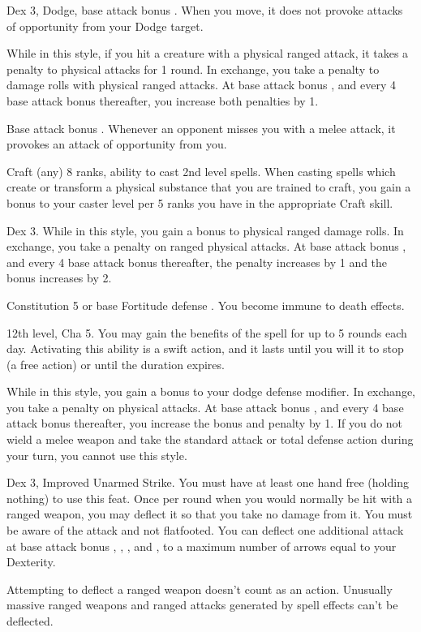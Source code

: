  Dex 3, Dodge, base attack bonus .
 When you move, it does not provoke attacks of opportunity from your Dodge target.

 While in this style, if you hit a creature with a physical ranged attack, it takes a  penalty to physical attacks for 1 round. In exchange, you take a  penalty to damage rolls with physical ranged attacks. At base attack bonus , and every 4 base attack bonus thereafter, you increase both penalties by 1.

\featpre Base attack bonus .
\featben Whenever an opponent misses you with a melee attack, it provokes an attack of opportunity from you.

\featpres Craft (any) 8 ranks, ability to cast 2nd level spells.
\featben When casting spells which create or transform a physical substance that you are trained to craft, you gain a  bonus to your caster level per 5 ranks you have in the appropriate Craft skill.

 Dex 3.
 While in this style, you gain a  bonus to physical ranged damage rolls. In exchange, you take a  penalty on ranged physical attacks. At base attack bonus , and every 4 base attack bonus thereafter, the penalty increases by 1 and the bonus increases by 2.

\featpre Constitution 5 or base Fortitude defense .
\featben You become immune to death effects.

\featpre 12th level, Cha 5.
\featben You may gain the benefits of the  spell for up to 5 rounds each day. Activating this ability is a swift action, and it lasts until you will it to stop (a free action) or until the duration expires.

 While in this style, you gain a  bonus to your dodge defense modifier. In exchange, you take a  penalty on physical attacks. At base attack bonus , and every 4 base attack bonus thereafter, you increase the bonus and penalty by 1. If you do not wield a melee weapon and take the standard attack or total defense action during your turn, you cannot use this style.

 Dex 3, Improved Unarmed Strike.
 You must have at least one hand free (holding nothing) to use this feat. Once per round when you would normally be hit with a ranged weapon, you may deflect it so that you take no damage from it. You must be aware of the attack and not flatfooted. You can deflect one additional attack at base attack bonus , , , and , to a maximum number of arrows equal to your Dexterity.
\par Attempting to deflect a ranged weapon doesn't count as an action. Unusually massive ranged weapons and ranged attacks generated by spell effects can't be deflected.

